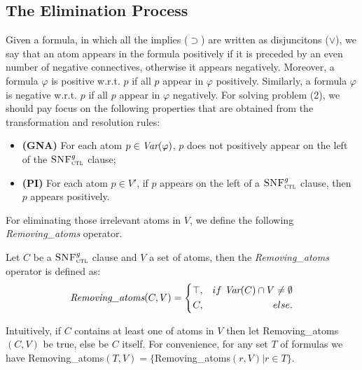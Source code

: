 \documentclass[letterpaper]{article} %
\begin{document}
\subsection{The Elimination Process}
Given a formula, in which all the implies ($\supset$) are written as disjuncitons ($\vee$), we say that an atom appears in the formula positively if it is preceded by an even number of negative connectives, otherwise it appears negatively. Moreover, a formula $\varphi$ is positive w.r.t. $p$ if all $p$ appear in $\varphi$ positively. Similarly, a formula $\varphi$ is negative w.r.t. $p$ if all $p$ appear in $\varphi$ negatively.
For solving problem (2), we should pay focus on the following properties that are obtained from the transformation and resolution rules:
\begin{itemize}
  \item \textbf{(GNA)} For each atom $p \in  \textit{Var}(\varphi)$, $p$ does not positively appear on the left of the ${\textsc{SNF}_{\textsc{ctl}}^g}$ clause;
  \item \textbf{(PI)} For each atom $p\in V'$, if $p$ appears on the left of a ${\textsc{SNF}_{\textsc{ctl}}^g}$ clause, then $p$ appears positively.
\end{itemize}



For eliminating those irrelevant atoms in $V$, we define the following \emph{Removing\_atoms} operator.

\begin{definition}\label{def:Elm}
Let $C$ be a ${\textsc{SNF}_{\textsc{ctl}}^g}$ clause and $V$ a set of atoms, then the \emph{Removing\_atoms} operator is defined as:
$$ \emph{Removing\_atoms}(C, V)=\left\{
\begin{aligned}
\top, && if\ \textit{Var}(C) \cap V \neq \emptyset \\
C, && else.
\end{aligned}
\right.
$$
\end{definition}
Intuitively, if $C$ contains at least one of atoms in $V$ then let Removing\_atoms$(C, V)$ be true, else be $C$ itself.
For convenience, for any set $T$ of formulas we have Removing\_atoms$(T, V) = \{$Removing\_atoms$(r, V) | r \in T\}$.
\end{document}

